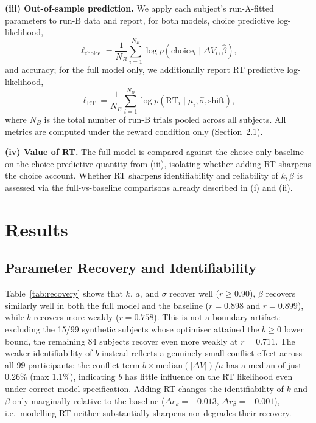 \documentclass[11pt,a4paper]{article}
\begin{document}
	\textbf{(iii) Out-of-sample prediction.} We apply each subject's run-A-fitted parameters to run-B data and report, for both models, choice predictive log-likelihood,
	\begin{equation*}
		\ell_{\text{choice}} = \frac{1}{N_B}\sum_{i=1}^{N_B} \log p(\text{choice}_i \mid \Delta V_i, \hat\beta),
	\end{equation*}
	and accuracy; for the full model only, we additionally report RT predictive log-likelihood,
	\begin{equation*}
		\ell_{\text{RT}} = \frac{1}{N_B}\sum_{i=1}^{N_B} \log p(\text{RT}_i \mid \mu_i, \hat\sigma, \text{shift}),
	\end{equation*}
	where $N_B$ is the total number of run-B trials pooled across all subjects.
	All metrics are computed under the reward condition only (Section~2.1).
	
	\textbf{(iv) Value of RT.} The full model is compared against the choice-only baseline on the choice predictive quantity from (iii), isolating whether adding RT sharpens the choice account. Whether RT sharpens identifiability and reliability of $k,\beta$ is assessed via the full-vs-baseline comparisons already described in (i) and (ii).
	
	\section{Results}
	
	\subsection{Parameter Recovery and Identifiability}
	
	Table~\ref{tab:recovery} shows that $k$, $a$, and $\sigma$ recover well ($r\geq0.90$), $\beta$ recovers similarly well in both the full model and the baseline ($r=0.898$ and $r=0.899$), while $b$ recovers more weakly ($r=0.758$). This is not a boundary artifact: excluding the 15/99 synthetic subjects whose optimiser attained the $b\geq0$ lower bound, the remaining 84 subjects recover even more weakly at $r=0.711$. The weaker identifiability of $b$ instead reflects a genuinely small conflict effect across all 99 participants: the conflict term $b\times\text{median}(|\Delta V|)/a$ has a median of just 0.26\% (max 1.1\%), indicating $b$ has little influence on the RT likelihood even under correct model specification. Adding RT changes the identifiability of $k$ and $\beta$ only marginally relative to the baseline ($\Delta r_k=+0.013$, $\Delta r_\beta=-0.001$), i.e.\ modelling RT neither substantially sharpens nor degrades their recovery.
	
\end{document}
